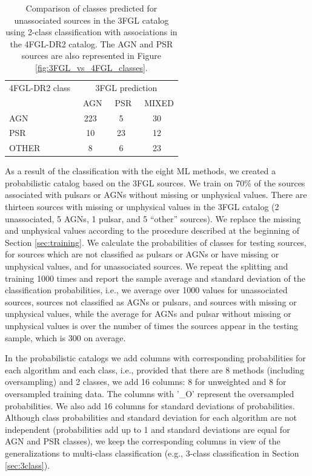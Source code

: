 \begin{table}[!h]
 \renewcommand{\tabcolsep}{0.3mm}
\renewcommand{\arraystretch}{1.5}

    \begin{tabular}{l c c c}
    \hline
    \hline
    4FGL-DR2 class & \multicolumn{3}{c}{3FGL prediction} \\
      &\ AGN &\ PSR &\ MIXED \\
    \hline
    AGN & 223 & 5 &  30 \\ %
    PSR & 10 & 23 &  12  \\ %
    OTHER & 8 & 6 & 23  \\ %
    \hline
    \end{tabular}%
    \vspace{0.2cm}
    \caption{Comparison of classes predicted for unassociated sources in the 3FGL catalog using 2-class classification
    with associations in the 4FGL-DR2 catalog. 
    The AGN and PSR sources are also represented in Figure \ref{fig:3FGL_vs_4FGL_classes}.}
    \label{tab:3FGL_vs_4FGL_2class}
\end{table}


As a result of the classification with the eight ML methods,
we created a probabilistic catalog based on the 3FGL sources.
We train on 70\% of the sources associated with pulsars or AGNs without missing or unphysical values.
There are thirteen sources with missing or unphysical values in the 3FGL catalog (2 unassociated, 5 AGNs, 1 pulsar, and 5 ``other'' sources).
We replace the missing and unphysical values according to the procedure described at the beginning of Section \ref{sec:training}.
We calculate the probabilities of classes for testing sources, for sources which are not classified as pulsars or AGNs or have missing or unphysical values, and for unassociated sources.
We repeat the splitting and training 1000 times and report the sample average and standard deviation of the classification probabilities,
i.e., we average over 1000 values for unassociated sources, sources not classified as AGNs or pulsars, and sources with missing or unphysical values,
while the average for AGNs and pulsar without missing or unphysical values is over the number of times the sources appear in the testing sample, which is 300 on average.


In the probabilistic catalogs we add columns with corresponding probabilities for each algorithm and each class,
i.e., provided that there are 8 methods (including oversampling) and 2 classes, we add 16 columns: 8 for unweighted and 8 for oversampled training data. The columns with '\_O' represent the oversampled probabilities. We also add 16 columns for standard deviations of probabilities. Although class probabilities and standard deviation for each algorithm are not independent (probabilities add up to 1 and standard deviations are equal for AGN and PSR classes), we keep the corresponding columns in view of the generalizations to multi-class classification (e.g., 3-class classification in Section \ref{sec:3class}).


